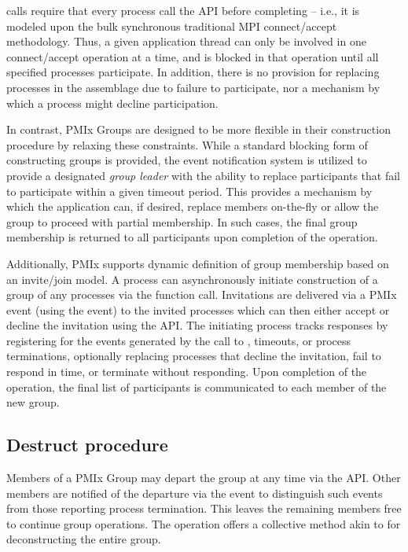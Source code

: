  calls require that every process call the \ac{API} before completing – i.e., it is modeled upon the bulk synchronous traditional \ac{MPI} connect/accept methodology. Thus, a given application thread can only be involved in one connect/accept operation at a time, and is blocked in that operation until all specified processes participate. In addition, there is no provision for replacing processes in the assemblage due to failure to participate, nor a mechanism by which a process might decline participation.

In contrast, \ac{PMIx} Groups are designed to be more flexible in their construction procedure by relaxing these constraints. While a standard blocking form of constructing groups is provided, the event notification system is utilized to provide a designated \emph{group leader} with the ability to replace participants that fail to participate within a given timeout period. This provides a mechanism by which the application can, if desired, replace members on-the-fly or allow the group to proceed with partial membership. In such cases, the final group membership is returned to all participants upon completion of the operation.

Additionally, \ac{PMIx} supports dynamic definition of group membership based on an invite/join model. A process can asynchronously initiate construction of a group of any processes via the  function call. Invitations are delivered via a \ac{PMIx} event (using the  event) to the invited processes which can then either accept or decline the invitation using the  \ac{API}. The initiating process tracks responses by registering for the events generated by the call to , timeouts, or process terminations, optionally replacing processes that decline the invitation, fail to respond in time, or terminate without responding. Upon completion of the operation, the final list of participants is communicated to each member of the new group.

\subsection{Destruct procedure}

Members of a \ac{PMIx} Group may depart the group at any time via the  \ac{API}. Other members are notified of the departure via the  event to distinguish such events from those reporting process termination. This leaves the remaining members free to continue group operations. The  operation offers a collective method akin to  for deconstructing the entire group.

